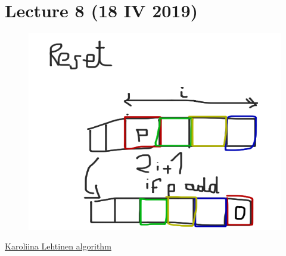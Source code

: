 \section{Lecture 8 (18 IV 2019)}
\begin{figure}[H]
    \centering
    \includegraphics[scale=0.2]{content/graphics/game7.png}
\end{figure}
\href{https://dl.acm.org/ft_gateway.cfm?id=3209115&ftid=1982453&dwn=1&CFID=123825150&CFTOKEN=83e223cdf7d5823a-A4DA4330-AB4A-563D-5D3314A8B85B927F}{Karoliina Lehtinen algorithm}